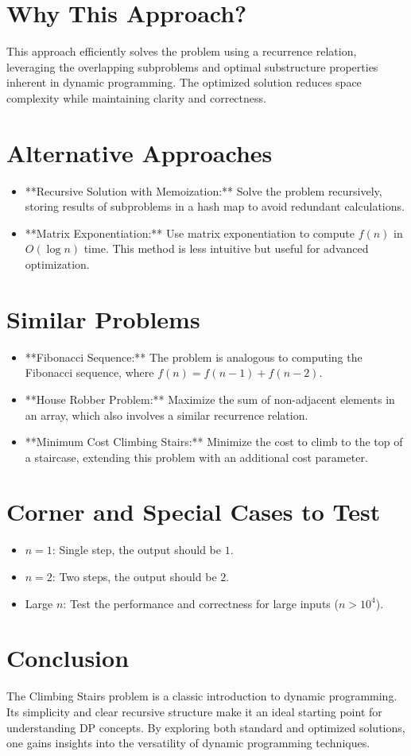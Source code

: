 \section*{Why This Approach?}
This approach efficiently solves the problem using a recurrence relation, leveraging the overlapping subproblems and optimal substructure properties inherent in dynamic programming. The optimized solution reduces space complexity while maintaining clarity and correctness.

\section*{Alternative Approaches}
\begin{itemize}
    \item **Recursive Solution with Memoization:** Solve the problem recursively, storing results of subproblems in a hash map to avoid redundant calculations.
    \item **Matrix Exponentiation:** Use matrix exponentiation to compute \( f(n) \) in \( O(\log n) \) time. This method is less intuitive but useful for advanced optimization.
\end{itemize}

\section*{Similar Problems}
\begin{itemize}
    \item **Fibonacci Sequence:** The problem is analogous to computing the Fibonacci sequence, where \( f(n) = f(n-1) + f(n-2) \).
    \item **House Robber Problem:** Maximize the sum of non-adjacent elements in an array, which also involves a similar recurrence relation.
    \item **Minimum Cost Climbing Stairs:** Minimize the cost to climb to the top of a staircase, extending this problem with an additional cost parameter.
\end{itemize}

\section*{Corner and Special Cases to Test}
\begin{itemize}
    \item \( n = 1 \): Single step, the output should be \( 1 \).
    \item \( n = 2 \): Two steps, the output should be \( 2 \).
    \item Large \( n \): Test the performance and correctness for large inputs (\( n > 10^4 \)).
\end{itemize}

\section*{Conclusion}
The Climbing Stairs problem is a classic introduction to dynamic programming. Its simplicity and clear recursive structure make it an ideal starting point for understanding DP concepts. By exploring both standard and optimized solutions, one gains insights into the versatility of dynamic programming techniques.